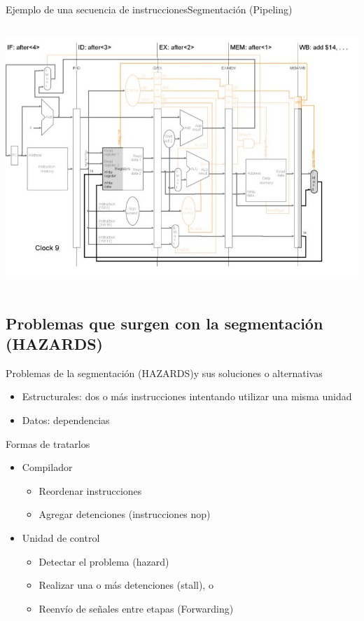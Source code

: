 \documentclass[aspectratio=169,compress]{beamer}
\begin{document}
\begin{footnotesize}
\begin{frame}{Ejemplo de una secuencia de instrucciones}{Segmentación (Pipeling)}
\begin{columns}[onlytextwidth,T]
      \column{100mm}
\includegraphics[scale=0.35]{images/pipeling9.jpg} 
    \end{columns}

\end{frame}













\subsection{Problemas que surgen con la segmentación (HAZARDS)}



\begin{frame}{Problemas de la segmentación (HAZARDS)}{y sus soluciones o alternativas}

\begin{itemize}
\item Estructurales: dos o más instrucciones intentando utilizar una misma unidad
\item Datos: dependencias
\end{itemize}

Formas de tratarlos
\begin{itemize}
\item Compilador
\begin{itemize}
\item Reordenar instrucciones
\item Agregar detenciones (instrucciones nop)
\end{itemize}
\item Unidad de control
\begin{itemize}
\item Detectar el problema (hazard)
\item Realizar una o más detenciones (stall), o 
\item Reenvío de señales entre etapas (Forwarding)
\end{itemize}
\end{itemize}


\end{frame}
\end{footnotesize}
\end{document}
